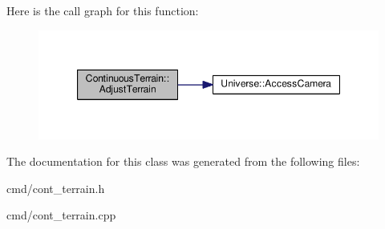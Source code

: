 Here is the call graph for this function\+:
\nopagebreak
\begin{figure}[H]
\begin{center}
\leavevmode
\includegraphics[width=347pt]{dd/d00/classContinuousTerrain_a62d328b085bbc744966ebed9ea18c599_cgraph}
\end{center}
\end{figure}




The documentation for this class was generated from the following files\+:\begin{DoxyCompactItemize}
\item 
cmd/cont\+\_\+terrain.\+h\item 
cmd/cont\+\_\+terrain.\+cpp\end{DoxyCompactItemize}
